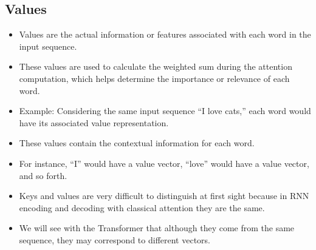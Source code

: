 \subsection{Values}
\begin{itemize}
\item Values are the actual information or features associated with each word in the input sequence.
\item These values are used to calculate the weighted sum during the attention computation, which helps determine the importance or relevance of each word.
\item Example: Considering the same input sequence ``I love cats,'' each word would have its associated value representation.
\item These values contain the contextual information for each word.
\item For instance, ``I'' would have a value vector, ``love'' would have a value vector, and so forth.
\item Keys and values are very difficult to distinguish at first sight because in RNN encoding and decoding with classical attention they are the same.
\item We will see with the Transformer that although they come from the same sequence, they may correspond to different vectors.

\end{itemize}


